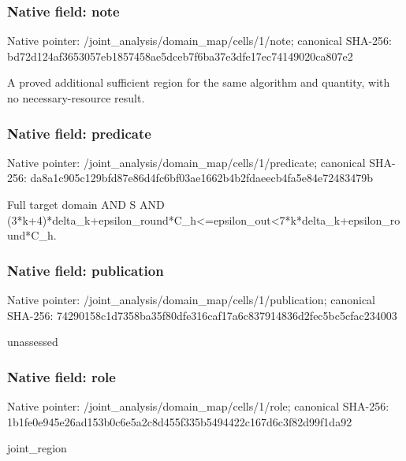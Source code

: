 \documentclass[10pt,a4paper]{article}
\begin{document}
\subsubsection{Native field: note}
Native pointer: /joint\_\allowbreak{}analysis/domain\_\allowbreak{}map/cells/1/note; canonical SHA-256: bd72d124af3653057eb1857458ae5dceb7f6ba37e3dfe17ec74149020ca807e2

\begingroup\raggedright\sloppy A proved additional sufficient region for the same algorithm and quantity,\allowbreak{} with no necessary-resource result.\par\endgroup

\subsubsection{Native field: predicate}
Native pointer: /joint\_\allowbreak{}analysis/domain\_\allowbreak{}map/cells/1/predicate; canonical SHA-256: da8a1c905c129bfd87e86d4fc6bf03ae1662b4b2fdaeecb4fa5e84e72483479b

\begingroup\raggedright\sloppy Full target domain AND S AND (3*k+4)*delta\_\allowbreak{}k+epsilon\_\allowbreak{}round*C\_\allowbreak{}h<=\allowbreak{}epsilon\_\allowbreak{}out<7*k*delta\_\allowbreak{}k+epsilon\_\allowbreak{}round*C\_\allowbreak{}h.\par\endgroup

\subsubsection{Native field: publication}
Native pointer: /joint\_\allowbreak{}analysis/domain\_\allowbreak{}map/cells/1/publication; canonical SHA-256: 74290158c1d7358ba35f80dfe316caf17a6c837914836d2fec5bc5cfac234003

\begingroup\raggedright\sloppy unassessed\par\endgroup

\subsubsection{Native field: role}
Native pointer: /joint\_\allowbreak{}analysis/domain\_\allowbreak{}map/cells/1/role; canonical SHA-256: 1b1fe0e945e26ad153b0c6e5a2c8d455f335b5494422c167d6c3f82d99f1da92

\begingroup\raggedright\sloppy joint\_\allowbreak{}region\par\endgroup
\end{document}
